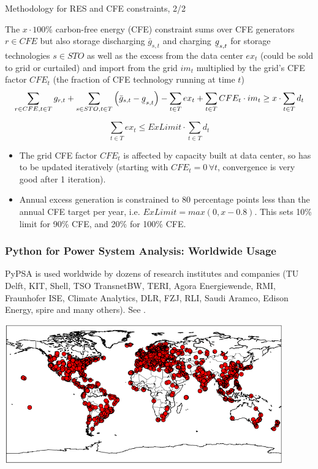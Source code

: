 \begin{frame}{Methodology for RES and CFE constraints, 2/2}


  The $x \cdot 100$\% \alert{carbon-free energy (CFE) constraint} sums over CFE generators $r\in CFE$ but also storage discharging $\bar{g}_{s,t}$ and charging $\ubar{g}_{s,t}$ for storage technologies $s\in STO$ as well as the excess from the data center $ex_t$ (could be sold to grid or curtailed) and import from the grid $im_t$ multiplied by the grid's CFE factor $CFE_t$ (the fraction of CFE technology running at time $t$)
  \begin{equation*}
  \sum_{r\in CFE, t\in T} g_{r,t} + \sum_{s\in STO, t\in T} \left(\bar{g}_{s,t} - \ubar{g}_{s,t}\right) - \sum_{t\in T} ex_t + \sum_{t\in T} CFE_t \cdot im_t \geq x \cdot \sum_{t\in T} d_t
  \end{equation*}

  \begin{equation*}
  \sum_{t\in T} ex_t \leq ExLimit \cdot \sum_{t\in T} d_t
  \end{equation*}

\begin{itemize}
    \item  The grid CFE factor $CFE_t$ is affected by capacity built at data center, so has to be updated iteratively (starting with $CFE_t =0 \, \forall t$, convergence is very good after 1 iteration).
    \item Annual excess generation is constrained to 80 percentage points less than the annual CFE target per year, i.e. $ExLimit = max(0, x - 0.8)$. This sets 10\% limit for 90\% CFE, 
     and 20\% for 100\% CFE.
\end{itemize}



\end{frame}


\begin{frame}
  \frametitle{Python for Power System Analysis: Worldwide Usage}

  PyPSA is used worldwide by \alert{dozens of research institutes and companies} (TU Delft, KIT, Shell, TSO TransnetBW, TERI, Agora Energiewende, RMI, Fraunhofer ISE, Climate Analytics, DLR, FZJ, RLI, Saudi Aramco, Edison Energy, spire and many others). See .

  \centering
  \includegraphics[width=12cm]{images/users.png}

\end{frame}


